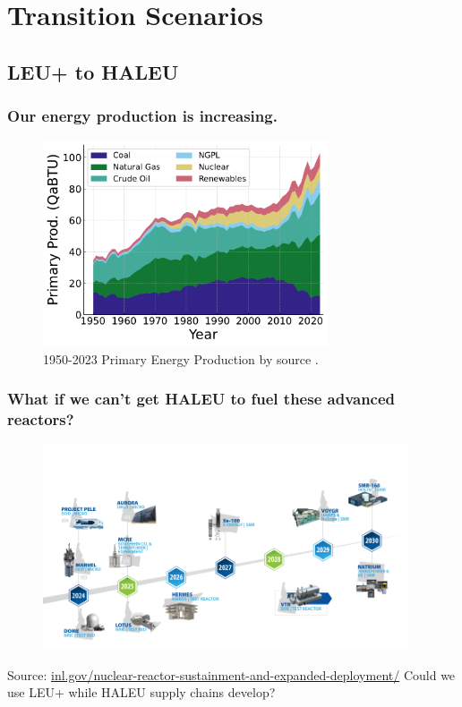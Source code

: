 \documentclass[9pt]{beamer}
\begin{document}
\section{Transition Scenarios}
  \subsection{LEU+ to HALEU}
  \begin{frame}
    \frametitle{Our energy production is increasing.}
    \begin{figure}
        \centering
        \includegraphics[width=0.75\textwidth]{images/prim_prod_b_source.pdf}
        \caption{1950-2023 Primary Energy Production by source \cite{mer_april_2024}.}
    \end{figure}
  \end{frame}

  \begin{frame}
    \frametitle{What if we can't get HALEU to fuel these advanced reactors?}
    \vspace{-25pt}
    \begin{figure}
        \centering
        \includegraphics[width=0.96\textwidth]{images/reactor_timeline.png}
    \end{figure}
    Source: \url{inl.gov/nuclear-reactor-sustainment-and-expanded-deployment/}
    \vspace{-8pt}
    Could we use LEU+ while HALEU supply chains develop?
  \end{frame}
\end{document}
